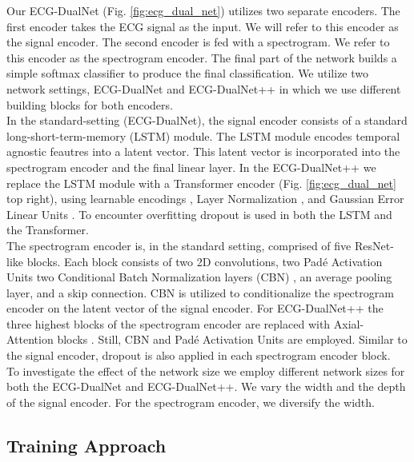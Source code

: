 Our ECG-DualNet (Fig. \ref{fig:ecg_dual_net}) utilizes two separate encoders. The first encoder takes the ECG signal as the input. We will refer to this encoder as the signal encoder. The second encoder is fed with a spectrogram. We refer to this encoder as the spectrogram encoder. The final part of the network builds a simple softmax classifier to produce the final classification. We utilize two network settings, ECG-DualNet and ECG-DualNet++ in which we use different building blocks for both encoders. \\
\indent In the standard-setting (ECG-DualNet), the signal encoder consists of a standard long-short-term-memory (LSTM) \cite{Hochreiter1997} module. The LSTM module encodes temporal agnostic feautres into a latent vector. This latent vector is incorporated into the spectrogram encoder and the final linear layer. In the ECG-DualNet++ we replace the LSTM module with a Transformer encoder \cite{Vaswani2017, Dosovitskiy2020} (Fig. \ref{fig:ecg_dual_net} top right), using learnable encodings \cite{Vaswani2017, Reich2020b}, Layer Normalization \cite{Ba2016}, and Gaussian Error Linear Units \cite{Hendrycks2016}. To encounter overfitting dropout \cite{Srivastava2014} is used in both the LSTM and the Transformer. \\
\indent The spectrogram encoder is, in the standard setting, comprised of five ResNet-like \cite{He2016} blocks. Each block consists of two 2D convolutions, two Pad\'{e} Activation Units \cite{Molina2020} two Conditional Batch Normalization layers (CBN) \cite{De2017}, an average pooling layer, and a skip connection. CBN is utilized to conditionalize the spectrogram encoder on the latent vector of the signal encoder. For ECG-DualNet++ the three highest blocks of the spectrogram encoder are replaced with Axial-Attention blocks \cite{Wang2020}. Still, CBN and Pad\'{e} Activation Units are employed. Similar to the signal encoder, dropout \cite{Srivastava2014} is also applied in each spectrogram encoder block. \\
\indent To investigate the effect of the network size we employ different network sizes for both the ECG-DualNet and ECG-DualNet++. We vary the width and the depth of the signal encoder. For the spectrogram encoder, we diversify the width.

\subsection{Training Approach} \label{subsec:training}

